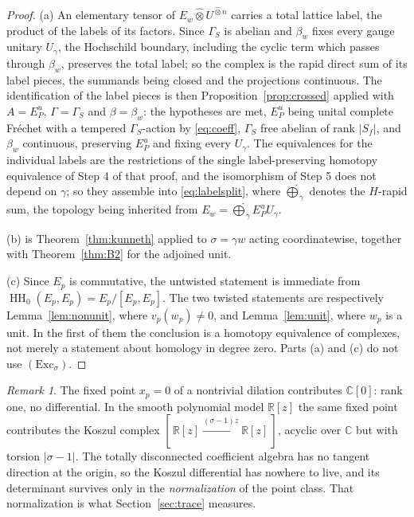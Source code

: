 \documentclass[11pt]{amsart}
\theoremstyle{definition}
\theoremstyle{remark}
\newtheorem{remark}[theorem]{Remark}
\newcommand{\C}{\mathbb C}
\newcommand{\R}{\mathbb R}
\newcommand{\HH}{\operatorname{HH}}
\begin{document}
\begin{proof}
(a)  An elementary tensor of
$E_w\widehat\otimes U^{\widehat\otimes n}$ carries
a total lattice label, the product of the labels of its factors.  Since
$\Gamma_S$ is abelian and $\beta_w$ fixes every gauge unitary $U_{\gamma}$, the
Hochschild boundary, including the cyclic term which passes through
$\beta_w$, preserves the total label; so the complex is the rapid direct sum of
its label pieces, the summands being closed and the projections continuous.
The identification of the label pieces is then
Proposition~\ref{prop:crossed} applied with $A=E_P^{u}$, $\Gamma=\Gamma_S$ and
$\beta=\beta_w$: the hypotheses are met, $E_P^{u}$ being unital complete
Fr\'echet with a tempered $\Gamma_S$-action by \eqref{eq:coeff}, $\Gamma_S$
free abelian of rank $|S_f|$, and $\beta_w$ continuous, preserving $E_P^{u}$
and fixing every $U_{\gamma}$.  The equivalences for the individual labels are
the restrictions of the single label-preserving homotopy equivalence of Step 4
of that proof, and the isomorphism of Step 5 does not depend on $\gamma$; so
they assemble into \eqref{eq:labelsplit}, where $\widehat\bigoplus_{\gamma}$
denotes the $H$-rapid sum, the topology being inherited from
$E_w=\widehat\bigoplus_{\gamma}E_P^{u}U_{\gamma}$.

(b) is Theorem~\ref{thm:kunneth} applied to $\sigma=\gamma w$ acting
coordinatewise, together with Theorem~\ref{thm:B2} for the adjoined unit.

(c)  Since $E_p$ is commutative, the untwisted statement is immediate from
$\HH_0(E_p,E_p)=E_p/[E_p,E_p]$.  The two twisted statements are respectively
Lemma~\ref{lem:nonunit}, where $v_p(w_p)\ne0$, and Lemma~\ref{lem:unit}, where
$w_p$ is a unit.  In the first of them the conclusion is a homotopy
equivalence of complexes, not merely a statement about homology in degree
zero.  Parts (a) and (c) do not use $(\mathrm{Exc}_{\sigma})$.
\end{proof}

\begin{remark}\label{rem:notorsion}
The fixed point $x_p=0$ of a nontrivial dilation contributes $\C[0]$: rank one,
no differential.  In the smooth polynomial model $\R[z]$ the same fixed point
contributes the Koszul complex
$[\,\R[z]\xrightarrow{(\sigma-1)z}\R[z]\,]$, acyclic over $\C$ but with torsion
$|\sigma-1|$.  The totally disconnected coefficient algebra has no tangent
direction at the origin, so the Koszul differential has nowhere to live, and
its determinant survives only in the \emph{normalization} of the point class.
That normalization is what Section~\ref{sec:trace} measures.
\end{remark}
\end{document}

